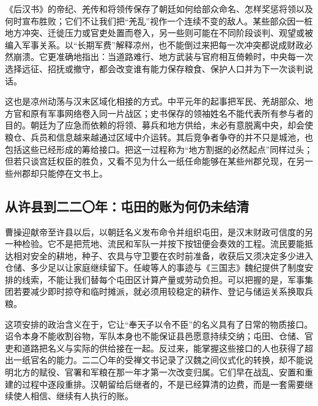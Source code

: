 《后汉书》的帝纪、羌传和将领传保存了朝廷如何给部众命名、怎样奖惩将领以及何时宣布胜败；它们不让我们把“羌乱”视作一个连续不变的敌人。某些部众因一桩地方冲突、迁徙压力或官吏处置而卷入，另一些则可能在不同阶段谈判、观望或被编入军事关系。以“长期军费”解释凉州，也不能倒过来把每一次冲突都说成财政必然崩溃。它更准确地指出：当道路难行、地方武装与官府相互倚赖时，中央每一次选择远征、招抚或撤守，都会改变谁有能力保存粮食、保护人口并为下一次谈判说话。

这也是凉州动荡与汉末区域化相接的方式。中平元年的起事把军民、羌胡部众、地方官和原有军事网络卷入同一片战区；史书保存的领袖姓名不能代表所有参与者的目的。朝廷为了应急而依赖的将领、募兵和地方供给，未必有意脱离中央，却会使粮仓、兵员和信息越来越通过区域中介运转。其后竞争者争夺的并不只是城池，也包括这些已经形成的筹给接口。把这一过程称为“地方割据的必然起点”同样过头；但若只谈宫廷权臣的胜负，又看不见为什么一纸任命能够在某些州郡兑现，在另一些州郡却只能停在文书上。

\subsection{从许县到二二〇年：屯田的账为何仍未结清}

曹操迎献帝至许县以后，以朝廷名义发布命令并组织屯田，是汉末财政可信度的另一种检验。它不是把荒地、流民和军队一并按下按钮便会奏效的工程。流民要能抵达相对安全的耕地，种子、农具与守卫要在农时前准备，收获后又须决定多少进入仓储、多少足以让家庭继续留下。任峻等人的事迹与《三国志》魏纪提供了制度安排的线索，不能让我们替每个屯田区计算产量或劳动负担。可以把握的是，军事集团若要减少即时掠夺和临时摊派，就必须用较稳定的耕作、登记与储运关系换取兵粮。

这项安排的政治含义在于，它让“奉天子以令不臣”的名义具有了日常的物质接口。诏令本身不能收割谷物，军队本身也不能保证县邑愿意持续交纳；屯田、仓储、官吏和道路把名义与实际的供给接在一起。反过来，能掌握这些接口的人也获得了超出一纸官名的能力。二二〇年的受禅文书记录了汉魏之间仪式化的转换，却不能说明北方的赋役、官署和军粮在那一年才第一次改变归属。它们早在战乱、安置和重建的过程中逐段重排。汉朝留给后继者的，不是已经算清的边费，而是一套需要继续使人相信、继续有人执行的账。

